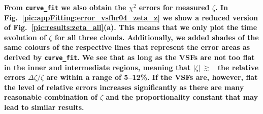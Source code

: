 \textbf{
    From \texttt{curve_fit} we also obtain the $\chi^2$ errors for measured $\zeta$. 
    In Fig.~\ref{pic:appFitting:error_vsfhr04_zeta_z} we show a reduced version of Fig.~\ref{pic:results:zeta_all}(a).
    This means that we only plot the time evolution of $\zeta$ for all three clouds.
    Additionally, we added shades of the same colours of the respective lines that represent the error areas as derived by \texttt{curve_fit}.
    We see that as long as the VSFs are not too flat in the inner and intermediate regions, meaning that $|\zeta|\,\gtrsim$~ the relative errors $\Delta \zeta / \zeta$ are within a range of 5--12\%. 
    If the VSFs are, however, flat the level of relative errors increases significantly as there are many reasonable combination of $\zeta$ and the proportionality constant that may lead to similar results. 
}





\endinput
